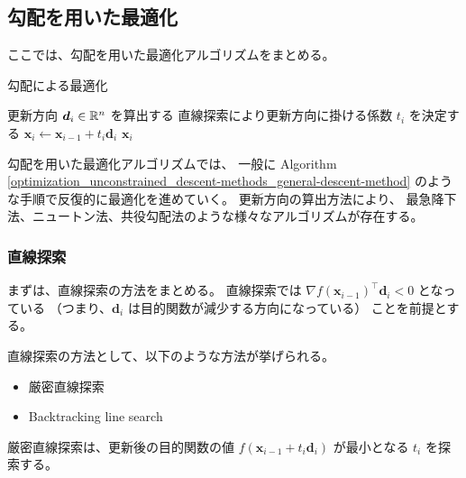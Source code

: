 %

\subsection{勾配を用いた最適化}

ここでは、勾配を用いた最適化アルゴリズムをまとめる。

\begin{algorithm}[tp]
    \caption{勾配による最適化}
    \label{optimization_unconstrained_descent-methods_general-descent-method}
    \begin{algorithmic}
                \State 更新方向 $\bm{d}_i \in \mathbb{R}^n$ を算出する
                \State 直線探索により更新方向に掛ける係数 $t_i$ を決定する
                \State $\bm{x}_i \gets \bm{x}_{i-1} + t_i \bm{d}_i$
                    \State \Return $\bm{x}_i$
                \EndIf
            \EndFor
        \EndProcedure
    \end{algorithmic}
\end{algorithm}

勾配を用いた最適化アルゴリズムでは、
一般に
Algorithm \ref{optimization_unconstrained_descent-methods_general-descent-method}
のような手順で反復的に最適化を進めていく。
更新方向の算出方法により、
最急降下法、ニュートン法、共役勾配法のような様々なアルゴリズムが存在する。

\subsubsection{直線探索}

まずは、直線探索の方法をまとめる。
直線探索では
$\nabla f(\bm{x}_{i-1})^\top \bm{d}_i < 0$ となっている
（つまり、$\bm{d}_i$ は目的関数が減少する方向になっている）
ことを前提とする。

直線探索の方法として、以下のような方法が挙げられる。

\begin{itemize}
    \item 厳密直線探索
    \item Backtracking line search
\end{itemize}

厳密直線探索は、更新後の目的関数の値
$f(\bm{x}_{i-1} + t_i \bm{d}_i)$
が最小となる $t_i$ を探索する。

